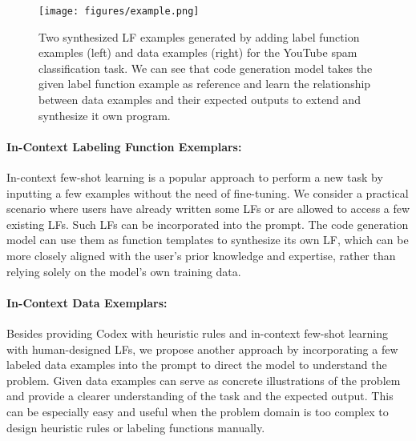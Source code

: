 \begin{figure}[t!]
    \centering
    \texttt{[image: figures/example.png]}
    \caption{Two synthesized LF examples generated by adding label function examples (left) and data examples (right) for the YouTube spam classification task. We can see that code generation model takes the given label function example as reference and learn the relationship between data examples and their expected outputs to extend and synthesize it own program.}
    \label{fig:lfe}
\end{figure}

\paragraph{In-Context Labeling Function Exemplars:}
In-context few-shot learning is a popular approach to perform a new task by inputting a few examples without the need of fine-tuning. We consider a practical scenario where users have already written some LFs or are allowed to access a few existing LFs. Such LFs can be incorporated into the prompt. The code generation model can use them as function templates to synthesize its own LF, which can be more closely aligned with the user's prior knowledge and expertise, rather than relying solely on the model's own training data.


\paragraph{In-Context Data Exemplars:}
Besides providing Codex with heuristic rules and in-context few-shot learning with human-designed LFs, we propose another approach by incorporating a few labeled data examples into the prompt to direct the model to understand the problem. Given data examples can serve as concrete illustrations of the problem and provide a clearer understanding of the task and the expected output. This can be especially easy and useful when the problem domain is too complex to design heuristic rules or labeling functions manually.

